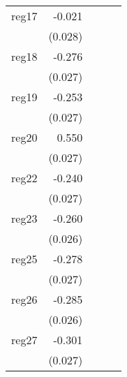 {\begin{longtable}{l*{4}{D{.}{.}{-1}}}
\addlinespace
reg17       &      -0.021         &                     &                     &                     \\
            &     (0.028)         &                     &                     &                     \\
\addlinespace
reg18       &      -0.276\sym{***}&                     &                     &                     \\
            &     (0.027)         &                     &                     &                     \\
\addlinespace
reg19       &      -0.253\sym{***}&                     &                     &                     \\
            &     (0.027)         &                     &                     &                     \\
\addlinespace
reg20       &       0.550\sym{***}&                     &                     &                     \\
            &     (0.027)         &                     &                     &                     \\
\addlinespace
reg22       &      -0.240\sym{***}&                     &                     &                     \\
            &     (0.027)         &                     &                     &                     \\
\addlinespace
reg23       &      -0.260\sym{***}&                     &                     &                     \\
            &     (0.026)         &                     &                     &                     \\
\addlinespace
reg25       &      -0.278\sym{***}&                     &                     &                     \\
            &     (0.027)         &                     &                     &                     \\
\addlinespace
reg26       &      -0.285\sym{***}&                     &                     &                     \\
            &     (0.026)         &                     &                     &                     \\
\addlinespace
reg27       &      -0.301\sym{***}&                     &                     &                     \\
            &     (0.027)         &                     &                     &                     \\

\end{longtable}}

